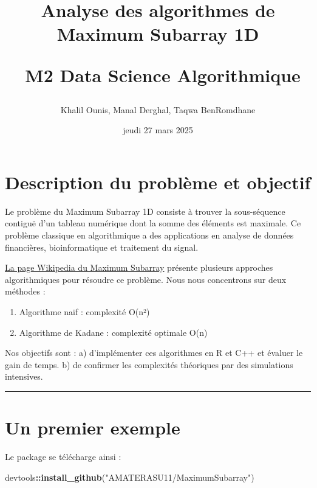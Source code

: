 \documentclass[
]{article}
\title{Analyse des algorithmes de Maximum Subarray 1D\\
\strut ~M2 Data Science Algorithmique}
\author{Khalil Ounis, Manal Derghal, Taqwa BenRomdhane}
\date{jeudi 27 mars 2025}
\newenvironment{Shaded}{\begin{snugshade}}{\end{snugshade}}
\newcommand{\FunctionTok}[1]{\textcolor[rgb]{0.13,0.29,0.53}{\textbf{#1}}}
\newcommand{\NormalTok}[1]{#1}
\newcommand{\SpecialCharTok}[1]{\textcolor[rgb]{0.81,0.36,0.00}{\textbf{#1}}}
\newcommand{\StringTok}[1]{\textcolor[rgb]{0.31,0.60,0.02}{#1}}
\providecommand{\tightlist}{%
  \setlength{\itemsep}{0pt}\setlength{\parskip}{0pt}}
\begin{document}
\maketitle

{
\hypersetup{linkcolor=}
\setcounter{tocdepth}{2}
\tableofcontents
}
\noindent\hrulefill

\section{Description du problème et
objectif}\label{description-du-probluxe8me-et-objectif}

Le problème du Maximum Subarray 1D consiste à trouver la sous-séquence
contiguë d'un tableau numérique dont la somme des éléments est maximale.
Ce problème classique en algorithmique a des applications en analyse de
données financières, bioinformatique et traitement du signal.

\href{https://en.wikipedia.org/wiki/Maximum_subarray_problem}{La page
Wikipedia du Maximum Subarray} présente plusieurs approches
algorithmiques pour résoudre ce problème. Nous nous concentrons sur deux
méthodes :

\begin{enumerate}
\def\labelenumi{\arabic{enumi}.}
\tightlist
\item
  Algorithme naïf : complexité O(n²)
\item
  Algorithme de Kadane : complexité optimale O(n)
\end{enumerate}

Nos objectifs sont : a) d'implémenter ces algorithmes en R et C++ et
évaluer le gain de temps. b) de confirmer les complexités théoriques par
des simulations intensives.

\begin{center}\rule{0.5\linewidth}{0.5pt}\end{center}

\section{Un premier exemple}\label{un-premier-exemple}

Le package se télécharge ainsi :

\begin{Shaded}
\begin{Highlighting}[]
\NormalTok{devtools}\SpecialCharTok{::}\FunctionTok{install\_github}\NormalTok{(}\StringTok{"AMATERASU11/MaximumSubarray"}\NormalTok{)}
\end{Highlighting}
\end{Shaded}
\end{document}
